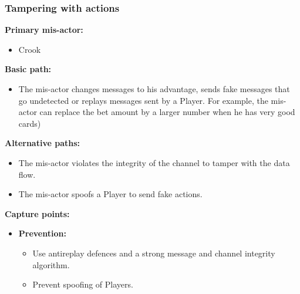 \documentclass[a4paper,11pt]{report}
\begin{document}
\subsubsection{Tampering with actions}
\label{PlayerFlowCasesT3}
\textbf{Primary mis-actor:}
\begin{itemize}
\item Crook
\end{itemize}
\textbf{Basic path:}
\begin{itemize}
\item The mis-actor changes messages to his advantage, sends fake messages that go undetected or replays messages sent by a Player. For example, the mis-actor can replace the bet amount by a larger number when he has very good cards)
\end{itemize}
\textbf{Alternative paths:}
\begin{itemize}
\item The mis-actor violates the integrity of the channel to tamper with the data flow.
\item The mis-actor spoofs a Player to send fake actions.
\end{itemize}
\textbf{Capture points:}
\begin{itemize}
\item \textbf{Prevention:}
\begin{itemize}
\item Use antireplay defences and a strong message and channel integrity algorithm.
\item Prevent spoofing of Players.
\end{itemize}
\end{itemize}
\end{document}
